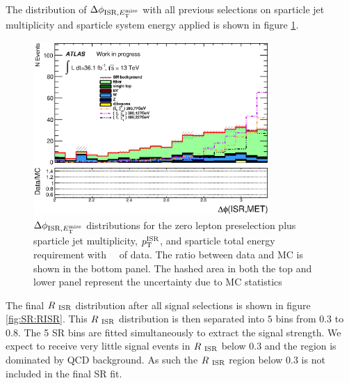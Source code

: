 \indent The distribution of $\Delta\phi_{\mathrm{ISR},E_{\mathrm{T}}^{\mathrm{miss}}}$ with all previous selections on sparticle jet multiplicity and sparticle system energy applied is shown in figure \ref{fig:SR:dphiISRMET}.   %

\begin{figure}[htbp]
  \begin{center}
     \includegraphics[width=0.80\textwidth]{figures/plotSR/SR_ND1_dphiISRI_6SR.eps}
  \end{center}
  \caption{$\Delta\phi_{\mathrm{ISR},E_{\mathrm{T}}^{\mathrm{miss}}}$ distributions for the zero lepton preselection plus sparticle jet multiplicity, $p_{\mathrm{T}}^{\mathrm{ISR}}$, and sparticle total energy requirement with \intlumi\ \ifb\ of data. The ratio between data and MC is shown in the bottom panel. The hashed area in both the top and lower panel represent the uncertainty due to MC statistics}
  \label{fig:SR:dphiISRMET}
\end{figure}

\indent The final $R_{~\mathrm{ISR}}$ distribution after all signal selections is shown in figure \ref{fig:SR:RISR}.  This $R_{~\mathrm{ISR}}$ distribution is then separated into $5$ bins from $0.3$ to $0.8$.  The 5 SR bins are fitted simultaneously to extract the signal strength.  We expect to receive very little signal events in $R_{~\mathrm{ISR}}$ below 0.3 and the region is dominated by QCD background.  As such the $R_{~\mathrm{ISR}}$ region below 0.3 is not included in the final SR fit.  \\

